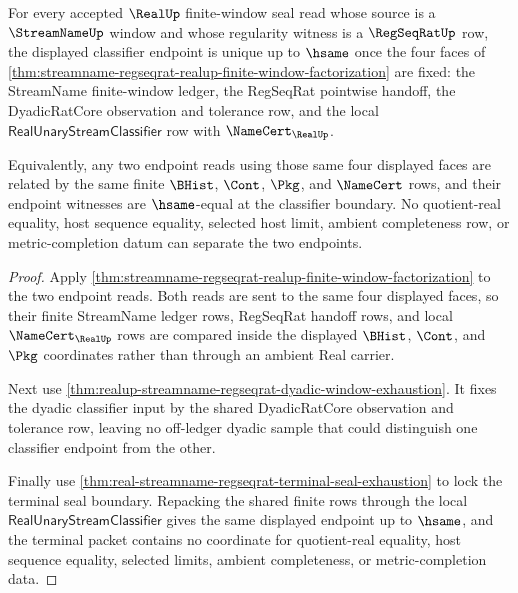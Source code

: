 \begin{theorem}
\label{thm:real-finite-window-classifier-endpoint-determinacy}
For every accepted $\RealUp$ finite-window seal read whose source is a
$\StreamNameUp$ window and whose regularity witness is a $\RegSeqRatUp$ row,
the displayed classifier endpoint is unique up to $\hsame$ once the four faces
of \autoref{thm:streamname-regseqrat-realup-finite-window-factorization} are
fixed: the StreamName finite-window ledger, the RegSeqRat pointwise handoff,
the DyadicRatCore observation and tolerance row, and the local
$\mathsf{RealUnaryStreamClassifier}$ row with $\NameCert_{\RealUp}$.

Equivalently, any two endpoint reads using those same four displayed faces are
related by the same finite $\BHist$, $\Cont$, $\Pkg$, and $\NameCert$ rows, and
their endpoint witnesses are $\hsame$-equal at the classifier boundary. No
quotient-real equality, host sequence equality, selected host limit, ambient
completeness row, or metric-completion datum can separate the two endpoints.
\end{theorem}
\begin{proof}
Apply
\autoref{thm:streamname-regseqrat-realup-finite-window-factorization} to the
two endpoint reads. Both reads are sent to the same four displayed faces, so
their finite StreamName ledger rows, RegSeqRat handoff rows, and local
$\NameCert_{\RealUp}$ rows are compared inside the displayed $\BHist$,
$\Cont$, and $\Pkg$ coordinates rather than through an ambient Real carrier.

Next use \autoref{thm:realup-streamname-regseqrat-dyadic-window-exhaustion}.
It fixes the dyadic classifier input by the shared DyadicRatCore observation
and tolerance row, leaving no off-ledger dyadic sample that could distinguish
one classifier endpoint from the other.

Finally use
\autoref{thm:real-streamname-regseqrat-terminal-seal-exhaustion} to lock the
terminal seal boundary. Repacking the shared finite rows through the local
$\mathsf{RealUnaryStreamClassifier}$ gives the same displayed endpoint up to
$\hsame$, and the terminal packet contains no coordinate for quotient-real
equality, host sequence equality, selected limits, ambient completeness, or
metric-completion data.
\end{proof}

